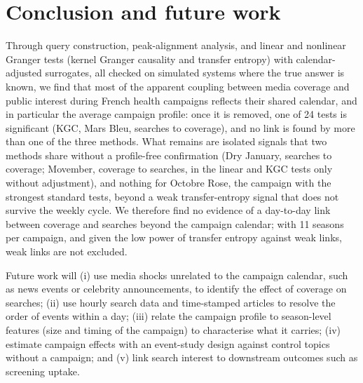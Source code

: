 \documentclass[11pt,a4paper]{article}
\begin{document}
\section{Conclusion and future work}
Through query construction, peak-alignment analysis, and linear and nonlinear Granger tests (kernel Granger causality and transfer entropy) with calendar-adjusted surrogates, all checked on simulated systems where the true answer is known, we find that most of the apparent coupling between media coverage and public interest during French health campaigns reflects their shared calendar, and in particular the average campaign profile: once it is removed, one of 24 tests is significant (KGC, Mars Bleu, searches to coverage), and no link is found by more than one of the three methods. What remains are isolated signals that two methods share without a profile-free confirmation (Dry January, searches to coverage; Movember, coverage to searches, in the linear and KGC tests only without adjustment), and nothing for Octobre Rose, the campaign with the strongest standard tests, beyond a weak transfer-entropy signal that does not survive the weekly cycle. We therefore find no evidence of a day-to-day link between coverage and searches beyond the campaign calendar; with 11 seasons per campaign, and given the low power of transfer entropy against weak links, weak links are not excluded.

Future work will (i) use media shocks unrelated to the campaign calendar, such as news events or celebrity announcements, to identify the effect of coverage on searches; (ii) use hourly search data and time-stamped articles to resolve the order of events within a day; (iii) relate the campaign profile to season-level features (size and timing of the campaign) to characterise what it carries; (iv) estimate campaign effects with an event-study design against control topics without a campaign; and (v) link search interest to downstream outcomes such as screening uptake.
\end{document}
